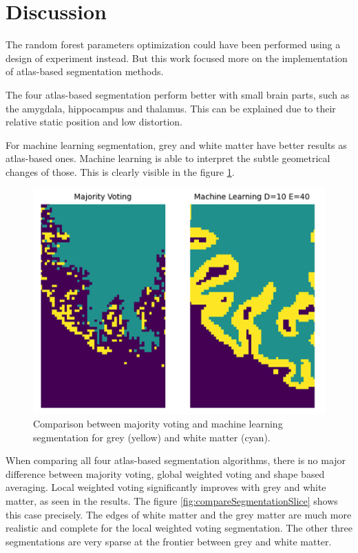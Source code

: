 \section*{Discussion}
The random forest parameters optimization could have been performed using a design of experiment instead. But this work focused more on the implementation of atlas-based segmentation methods.

The four atlas-based segmentation perform better with small brain parts, such as the amygdala, hippocampus and thalamus. This can be explained due to their relative static position and low distortion. 

For machine learning segmentation, grey and white matter have better results as atlas-based ones. Machine learning is able to interpret the subtle geometrical changes of those. This is clearly visible in the figure \ref{fig:compareGreyMatter}.

\begin{figure}[h!]
	\centering
	\includegraphics[width=.88\linewidth]{img/compareGreyMatter}
	\caption{Comparison between majority voting and machine learning segmentation for grey (yellow) and white matter (cyan).}
	\label{fig:compareGreyMatter}
\end{figure}

When comparing all four atlas-based segmentation algorithms, there is no major difference between majority voting, global weighted voting and shape based averaging. Local weighted voting significantly improves with grey and white matter, as seen in the results. The figure \ref{fig:compareSegmentationSlice} shows this case precisely. The edges of white matter and the grey matter are much more realistic and complete for the local weighted voting segmentation. The other three segmentations are very sparse at the frontier between grey and white matter.


